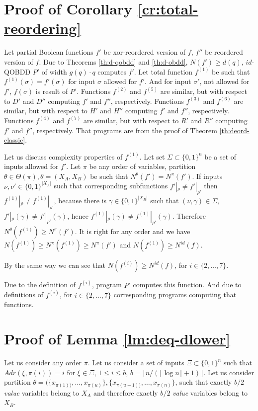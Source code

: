 \documentclass{llncs}
\begin{document}
\newpage
\appendix

\section{Proof of Corollary \ref{cr:total-reordering}}\label{apx:total-reordering}

Let partial Boolean functions $f'$ be xor-reordered version of $f$, $f''$ be reordered version of $f$. Due to Theorems \ref{th:d-qobdd} and \ref{th:d-obdd}, $N(f')\geq d(q)$, $id$-QOBDD $P'$ of width $g(q) \cdot q$ computes $f'$. Let total function $f^{(1)}$ be such that $f^{(1)}(\sigma)=f'(\sigma)$ for input $\sigma$ allowed for $f'$. 
And for input $\sigma'$, not allowed for $f'$, $f(\sigma)$ is result of $P'$. Functions $f^{(2)}$ and $f^{(5)}$ are similar, but with respect to $D'$ and $D''$ computing $f'$ and $f''$, respectively. Functions $f^{(3)}$ and $f^{(6)}$ are similar, but with respect to $H'$ and $H''$ computing $f'$ and $f''$, respectively. Functions $f^{(4)}$ and $f^{(7)}$ are similar, but with respect to $R'$ and $R''$ computing $f'$ and $f''$, respectively. That programs are from the proof of Theorem \ref{th:deord-classic}.

Let us discuss complexity properties of $f^{(1)}$. Let set $\Sigma\subset\{0,1\}^n$ be a set of inputs allowed for $f'$. 
 Let $\pi$ be any order of variables, partition $\theta\in\Theta(\pi), \theta=(X_A,X_B)$ be such that $N^{\theta}(f')=N^{\pi}(f')$. 
If inputs $\nu,\nu'\in\{0,1\}^{|X_A|}$ such that corresponding subfunctions $f'|_\rho\neq f'|_{\rho'}$ then $f^{(1)}|_\rho\neq f^{(1)}|_{\rho'}$, because there is $\gamma\in\{0,1\}^{|X_B|}$ such that $(\nu,\gamma)\in\Sigma$, $f'|_\rho(\gamma)\neq f'|_{\rho'}(\gamma)$, hence $f^{(1)}|_\rho(\gamma)\neq f^{(1)}|_{\rho'}(\gamma)$. Therefore $N^{\theta}(f^{(1)})\geq N^{\pi}(f')$. It is right for any order and we have $N(f^{(1)})\geq N^{\pi}(f^{(1)})\geq N^{\pi}(f')$ and $N(f^{(1)})\geq N^{id}(f)$.

By the same way we can see that  $N(f^{(i)})\geq N^{id}(f)$, for $i\in\{2,\dots,7\}$. 


Due to the definition of $f^{(i)}$, program $P'$ computes this function. And due to definitions of $f^{(i)}$, for $i\in\{2,\dots,7\}$ corresponding programs computing that functions. 

\section{Proof of Lemma \ref{lm:deq-dlower}}\label{apx:deq-dlower}
Let us consider any order $\pi$. Let us consider a set of inputs $\Xi\subset \{0,1\}^n$ such that $Adr(\xi,\pi(i))=i$ for $\xi\in\Xi$, $1\leq i \leq b$, $b= \lfloor n/(\lceil \log n \rceil +1) \rfloor$. Let us consider partition $\theta=(\{x_{\pi(1))},\dots,x_{\pi(u)}\},\{x_{\pi(u+1))},\dots,x_{\pi(n)}\}$, such that exactly $b/2$ {\em value} variables belong to $X_A$ and therefore exactly $b/2$ {\em value} variables belong to $X_B$.
\end{document}
